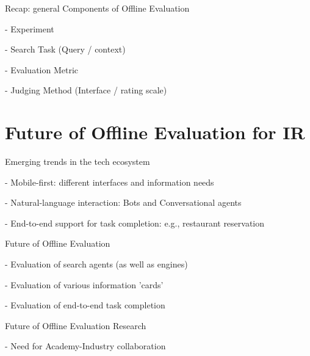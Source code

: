 \documentclass[openany]{now} %
\newcommand{\newpar}{\bigskip\noindent}
\begin{document}
Recap: general Components of Offline Evaluation

-	Experiment

-	Search Task (Query / context)

-	Evaluation Metric

-	Judging Method (Interface / rating scale) 


\section{Future of Offline Evaluation for IR}

Emerging trends in the tech ecosystem

- Mobile-first: different interfaces and information needs

- Natural-language interaction: Bots and Conversational agents

- End-to-end support for task completion: e.g., restaurant reservation 

\newpar
Future of Offline Evaluation

- Evaluation of search agents (as well as engines)

- Evaluation of various information 'cards'

- Evaluation of end-to-end task completion

\newpar
Future of Offline Evaluation Research

- Need for Academy-Industry collaboration

\backmatter  %



	
\end{document}
